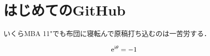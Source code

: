 \documentclass[b5j,fleqn]{jsarticle}
\begin{document}
\section{はじめてのGitHub}
いくらMBA 11"でも布団に寝転んで原稿打ち込むのは一苦労する．

\begin{align}
   \rm{e}^{\rm{i}\theta} &= -1
\end{align}
\end{document}
